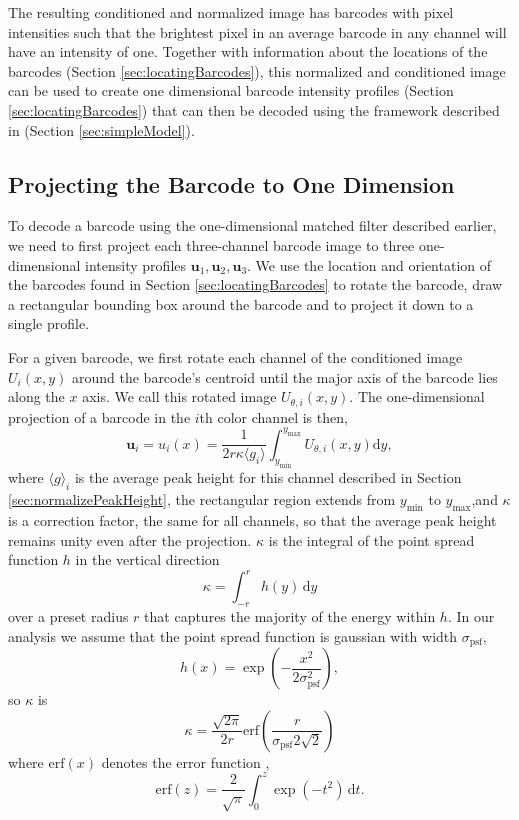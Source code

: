 The resulting conditioned and normalized image has barcodes with pixel intensities such that the brightest pixel in an average barcode in any channel will have an intensity of one. Together with information about the locations of the barcodes (Section \ref{sec:locatingBarcodes}), this normalized and conditioned image can be used to create one dimensional barcode intensity profiles (Section \ref{sec:locatingBarcodes}) that can then be decoded using the framework described in (Section \ref{sec:simpleModel}).

  
\subsection{Projecting the Barcode to One Dimension} \label{sec:projectDown}
To decode a barcode using the one-dimensional matched filter described earlier, we need to first project each three-channel barcode image to three one-dimensional intensity profiles $\mathbf{u}_1, \mathbf{u}_2, \mathbf{u}_3$.  We use the location and orientation of the barcodes found in Section \ref{sec:locatingBarcodes} to rotate the barcode, draw a rectangular bounding box around the barcode and to project it down to a single profile.

  For a given barcode, we first rotate each channel of the  conditioned image $U_i(x,y)$ around the barcode's centroid until the major axis of the barcode lies along the $x$ axis. We call this rotated image  $U_{\theta,i}(x,y)$. The one-dimensional projection of a barcode in the $i$th color channel is then, 
\begin{equation}\label{eq:projectDown}
	   \mathbf{u}_i=u_i(x)=\frac{1}{2r\kappa\langle g_i \rangle}  \int_{y_{\text{min}}}^{y_{\text{max}}} { {U_{\theta,i}(x,y) \mathrm{d}y} },
\end{equation}
where $\langle g \rangle_i$ is the average peak height for this channel described in Section \ref{sec:normalizePeakHeight}, the rectangular region extends from $y_{\text{min}}$ to $y_{\text{max}}$,and $\kappa$ is a correction factor, the same for all channels, so that the average peak height remains unity even after the projection. $\kappa$ is the integral of the point spread function $h$ in the vertical direction
\begin{equation}
	\kappa=\int_{-r}^{r} h(y) \, \mathrm{d}y
\end{equation}
over a preset radius $r$ that captures the majority of the energy within $h$. In our analysis we assume that the point spread function is gaussian with width $\sigma_{\text{psf}}$,
\begin{equation}\label{eq:psf}
h(x)=\exp \left(  -\frac{x^2}{2\sigma_{\text{psf}}^2} \right),
\end{equation}
so $\kappa$ is
\begin{equation}
\kappa = \frac{\sqrt{2\pi}} {2r} \text{erf} \left(\frac{r}{\sigma_{\text{psf}}2\sqrt{2}} \right)
\end{equation}
where $\text{erf}(x)$ denotes the error function \citep{reif_fundamentals_1965},
\begin{equation}
\text{erf}(z) = \frac{2}{\sqrt{\pi}} \int_0^z \exp (-t^2) \, \mathrm{d}t.
\end{equation}


